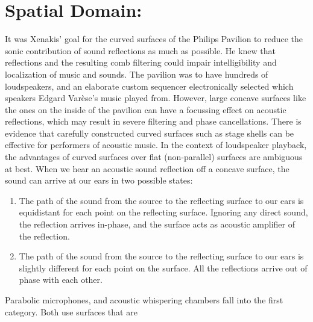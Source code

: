 \chapter{Spatial Domain: }
\label{ch:ref-mod}

It was Xenakis' goal for the curved surfaces of the Philips Pavilion
to reduce the sonic contribution of sound reflections as much as
possible.\cite{philips1958} He knew that reflections and the resulting
comb filtering could impair intelligibility and localization of music
and sounds.  The pavilion was to have hundreds of loudspeakers, and an
elaborate custom sequencer electronically selected which speakers
Edgard Var\`{e}se's music played from. However, large concave surfaces
like the ones on the inside of the pavilion can have a focussing
effect on acoustic reflections,\cite{Vercammen2008} which may result
in severe filtering and phase cancellations. There is evidence that
carefully constructed curved surfaces such as stage shells can be
effective for performers of acoustic music.\cite{DAntonio1991}
In the context of loudspeaker playback, the advantages of
curved surfaces over flat (non-parallel) surfaces are ambiguous at
best.\cite{Cox2006} When we hear an acoustic sound reflection off a
concave surface, the sound can arrive at our ears in two possible
states:
\begin{enumerate}
\item The path of the sound from the source to the reflecting surface
  to our ears is equidistant for each point on the reflecting
  surface. Ignoring any direct sound, the reflection arrives in-phase,
  and the surface acts as acoustic amplifier of the reflection.
\item The path of the sound from the source to the reflecting surface
  to our ears is slightly different for each point on the surface. All
  the reflections arrive out of phase with each other.
\end{enumerate}
Parabolic microphones\cite{Davis1989}, and acoustic whispering
chambers fall into the first category. Both use surfaces that are
